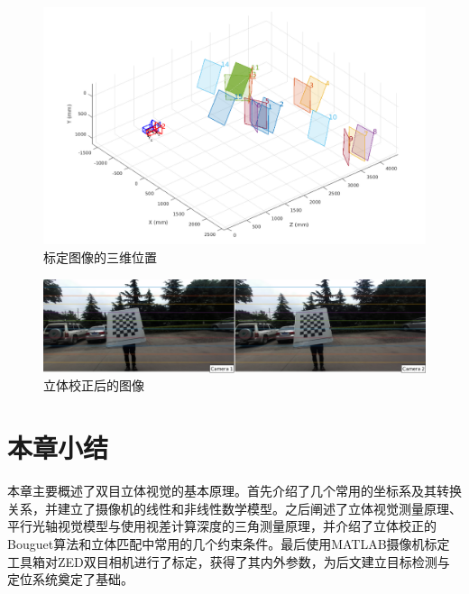 \begin{figure}[!htb] %
	\centering
	\includegraphics[width=5in]{figures/2_2_extrinsics}
	\caption{标定图像的三维位置}\label{fig:2_2_extrinsics}
\end{figure}

\begin{figure}[!htb] %
	\centering
	\includegraphics[width=6in]{figures/2_2_rectified_image}
	\caption{立体校正后的图像}\label{fig:2_2_rectified_image}
\end{figure}



\section{本章小结}
本章主要概述了双目立体视觉的基本原理。首先介绍了几个常用的坐标系及其转换关系，并建立了摄像机的线性和非线性数学模型。之后阐述了立体视觉测量原理、平行光轴视觉模型与使用视差计算深度的三角测量原理，并介绍了立体校正的Bouguet算法和立体匹配中常用的几个约束条件。最后使用MATLAB摄像机标定工具箱对ZED双目相机进行了标定，获得了其内外参数，为后文建立目标检测与定位系统奠定了基础。









